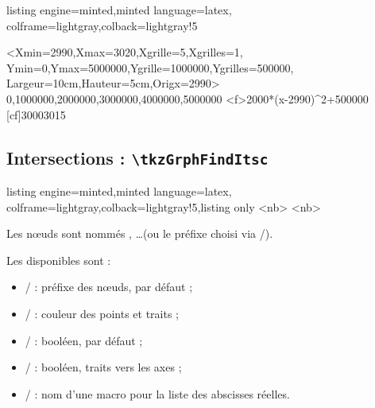 \documentclass[11pt,a4paper]{ltxdoc}
\begin{document}
\begin{tcblisting}{listing engine=minted,minted language=latex,
  colframe=lightgray,colback=lightgray!5}
\begin{tkzGrph}%
    <Xmin=2990,Xmax=3020,Xgrille=5,Xgrilles=1,
    Ymin=0,Ymax=5000000,Ygrille=1000000,Ygrilles=500000,
    Largeur=10cm,Hauteur=5cm,Origx=2990>
    {0,1000000,2000000,3000000,4000000,5000000}
  \tkzGrphDefineCurve[draw=false,name=cf]<f>{2000*(x-2990)^2+500000}
  [cf]{3000}{3015}
\end{tkzGrph}
\end{tcblisting}

\pagebreak

\subsection{Intersections : \texttt{\textbackslash tkzGrphFindItsc}}

\begin{tcblisting}{listing engine=minted,minted language=latex,
  colframe=lightgray,colback=lightgray!5,listing only}
<nb>
<nb>
\end{tcblisting}

Les nœuds sont nommés , \ldots (ou le préfixe choisi via /).

\smallskip

Les \MontreCode{[clés]} disponibles sont :

\begin{itemize}
	\item {} /  : préfixe des nœuds,  par défaut ;
	\item {} /  : couleur des points et traits ;
	\item {} /  : booléen,  par défaut ;
	\item {} /  : booléen, traits vers les axes ;
	\item {} /  : nom d'une macro pour la liste des abscisses réelles.
\end{itemize}
\end{document}
